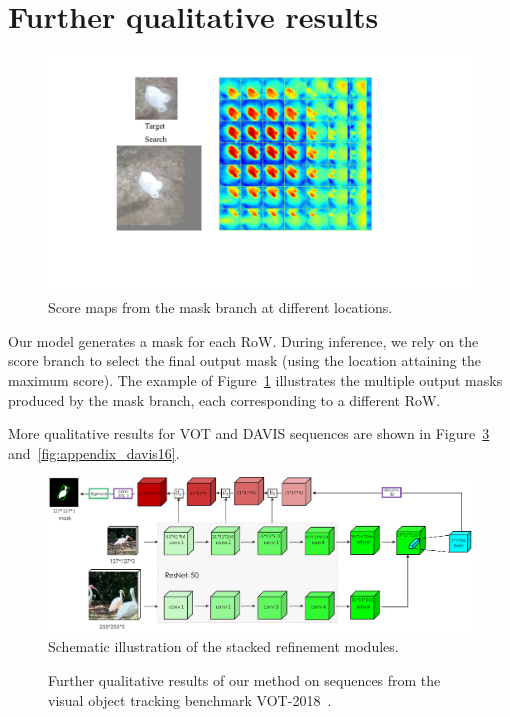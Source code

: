 \section{Further qualitative results}
\label{sec:appendix_qualitative}
\begin{figure}
\begin{center}
\includegraphics[width=0.47 \textwidth]{supp/heatmap_loc.pdf}
\end{center}
\vspace{-0.2cm}
\caption{Score maps from the mask branch at different locations.}
\label{fig:map}
\end{figure}

Our model generates a mask for each RoW.
During inference, we rely on the score branch to select the final output mask (using the location attaining the maximum score).
The example of Figure~\ref{fig:map} illustrates the multiple output masks produced by the mask branch, each corresponding to a different RoW.

More qualitative results for VOT and DAVIS sequences are shown in Figure~\ref{fig:appendix_vot18} and~\ref{fig:appendix_davis16}.

\begin{figure}[h]
\begin{center}
\includegraphics[width=0.9 \textwidth]{img/rm.pdf}
\end{center}
\vspace{-0.2cm}
\caption{Schematic illustration of the stacked refinement modules.}
\label{fig:rm}
\end{figure}

\begin{figure}
\centering

\vspace{-0.2cm}
\caption{Further qualitative results of our method on sequences from the visual object tracking benchmark VOT-2018~\cite{VOT2018}.}
\label{fig:appendix_vot18}
\end{figure}


